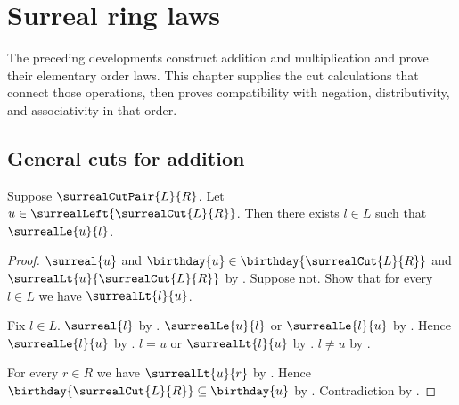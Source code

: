 

\section{Surreal ring laws}

The preceding developments construct addition and multiplication and prove
their elementary order laws.  This chapter supplies the cut calculations
that connect those operations, then proves compatibility with negation,
distributivity, and associativity in that order.

\subsection{General cuts for addition}

\begin{lemma}\label{surreal_cut_left_interpolation}
    Suppose $\surrealCutPair{L}{R}$.
    Let $u\in\surrealLeft{\surrealCut{L}{R}}$.
    Then there exists $l\in L$ such that $\surrealLe{u}{l}$.
\end{lemma}
\begin{proof}
    $\surreal{u}$ and
        $\birthday{u}\in\birthday{\surrealCut{L}{R}}$ and
        $\surrealLt{u}{\surrealCut{L}{R}}$
        by .
    Suppose not.
    Show that for every $l\in L$ we have $\surrealLt{l}{u}$.
    \begin{subproof}
        Fix $l\in L$.
        $\surreal{l}$ by .
        $\surrealLe{u}{l}$ or $\surrealLe{l}{u}$
            by .
        Hence $\surrealLe{l}{u}$ by \auto.
        $l=u$ or $\surrealLt{l}{u}$ by .
        $l\neq u$ by \auto.
    \end{subproof}
    For every $r\in R$ we have $\surrealLt{u}{r}$
        by
        .
    Hence $\birthday{\surrealCut{L}{R}}\subseteq\birthday{u}$
        by .
    Contradiction by .
\end{proof}

